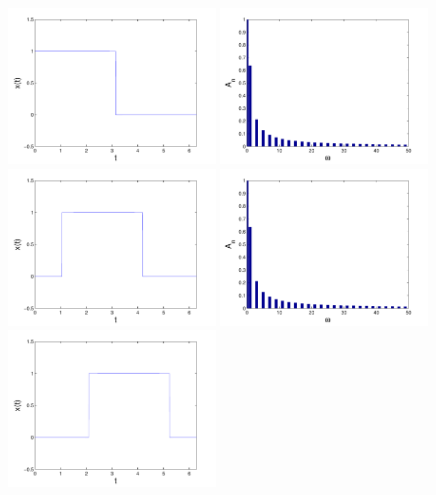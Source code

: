 \begin{refsection}
\begin{figure}
\centering
\includegraphics[width=0.49\textwidth]{kugel/kSpektrum/Rechteck1_1.pdf}
\includegraphics[width=0.49\textwidth]{kugel/kSpektrum/Rechteck1_2.pdf}
\includegraphics[width=0.49\textwidth]{kugel/kSpektrum/Rechteck2_1.pdf}
\includegraphics[width=0.49\textwidth]{kugel/kSpektrum/Rechteck1_2.pdf}
\includegraphics[width=0.49\textwidth]{kugel/kSpektrum/Rechteck3_1.pdf}

\end{figure}
\end{refsection}

